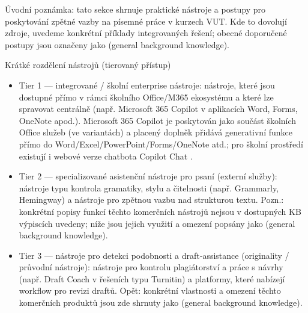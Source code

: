 Úvodní poznámka: tato sekce shrnuje praktické nástroje a postupy pro poskytování zpětné vazby na písemné práce v kurzech VUT. Kde to dovolují zdroje, uvedeme konkrétní příklady integrovaných řešení; obecné doporučené postupy jsou označeny jako (general background knowledge).

Krátké rozdělení nástrojů (tierovaný přístup)
\begin{itemize}
  \item Tier 1 — integrované / školní enterprise nástroje: nástroje, které jsou dostupné přímo v rámci školního Office/M365 ekosystému a které lze spravovat centrálně (např. Microsoft 365 Copilot v aplikacích Word, Forms, OneNote apod.). Microsoft 365 Copilot je poskytován jako součást školních Office služeb (ve variantách) a placený doplněk přidává generativní funkce přímo do Word/Excel/PowerPoint/Forms/OneNote atd.; pro školní prostředí existují i webové verze chatbota Copilot Chat \cite{kb_ai_101_tipu_pdf_04e4a115_page_3_1}. 
  \item Tier 2 — specializované asistenční nástroje pro psaní (externí služby): nástroje typu kontrola gramatiky, stylu a čitelnosti (např. Grammarly, Hemingway) a nástroje pro zpětnou vazbu nad strukturou textu. Pozn.: konkrétní popisy funkcí těchto komerčních nástrojů nejsou v dostupných KB výpiscích uvedeny; níže jsou jejich využití a omezení popsány jako (general background knowledge).
  \item Tier 3 — nástroje pro detekci podobnosti a draft‑assistance (originality / průvodní nástroje): nástroje pro kontrolu plagiátorství a práce s návrhy (např. Draft Coach v řešeních typu Turnitin) a platformy, které nabízejí workflow pro revizi draftů. Opět: konkrétní vlastnosti a omezení těchto komerčních produktů jsou zde shrnuty jako (general background knowledge).
\end{itemize}

